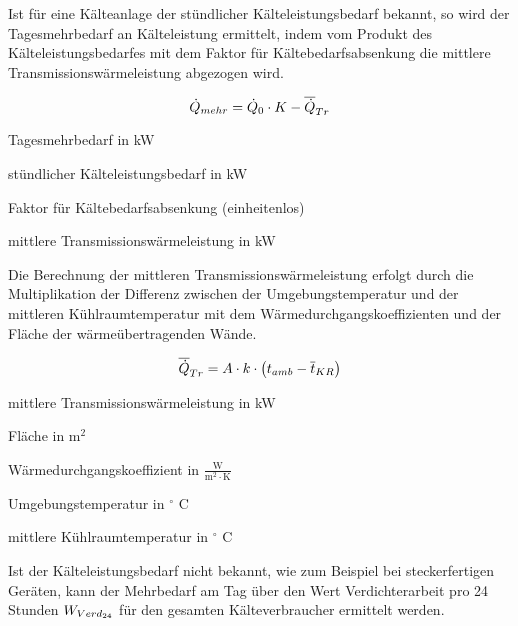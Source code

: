 Ist f\"ur eine K\"alteanlage der st\"undlicher K\"alteleistungsbedarf bekannt,
so wird der Tagesmehrbedarf an K\"alteleistung ermittelt, indem vom Produkt des
K\"alteleistungsbedarfes mit dem Faktor f\"ur K\"altebedarfsabsenkung die
mittlere Transmissionswärmeleistung abgezogen wird.

\begin{equation}
	\pmehr = \pkalt \cdot K - \aptrans
\label{pmehr}
\end{equation}

\begin{description}[\dth]

	\item[$\pmehr$] Tagesmehrbedarf in kW
	\item[$\pkalt$] st\"undlicher Kälteleistungsbedarf in kW
	\item[$K$] Faktor für Kältebedarfsabsenkung (einheitenlos)
	\item[$\aptrans$] mittlere Transmissionswärmeleistung in kW

\end{description}
\vspace{0.5cm}

Die Berechnung der mittleren Transmissionswärmeleistung erfolgt durch die
Multiplikation der Differenz zwischen der Umgebungstemperatur und der mittleren
Kühlraumtemperatur mit dem Wärmedurchgangskoeffizienten und der Fläche der
wärmeübertragenden Wände.

\begin{equation}
	\aptrans = A \cdot k \cdot \left( t_{amb} -
	\overline{t}_{KR} \right)
	\label{aptrans}
\end{equation}

\begin{description}[\dth]

	\item[$\aptrans$] mittlere Transmissionswärmeleistung in kW
	\item[$A$] Fläche in $\mathrm{m^2}$
	\item[$k$] Wärmedurchgangskoeffizient in $\mathrm{\frac{W}{m^2 \cdot K}}$
	\item[$t_{amb}$] Umgebungstemperatur in $^{\circ}$ C
	\item[$\overline{t}_{KR}$] mittlere Kühlraumtemperatur in
		$^{\circ}$ C
\end{description}
\vspace{0.5cm}

Ist der Kälteleistungsbedarf nicht bekannt, wie zum Beispiel bei steckerfertigen
Geräten, kann der Mehrbedarf am Tag \"uber den Wert Verdichterarbeit pro 24
Stunden ${W}_{Verd_{24}}$ für den gesamten Kälteverbraucher ermittelt werden.

